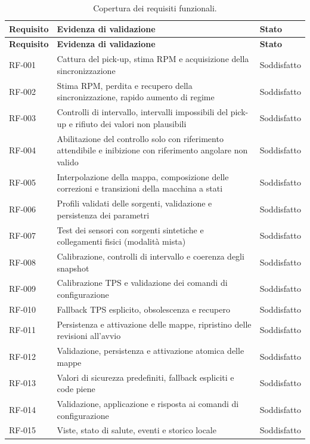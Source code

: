 \documentclass{article}
\begin{document}
{\small
\begin{longtable}{p{} p{} p{}}
\caption{Copertura dei requisiti funzionali.}
\label{tab:copertura} \\
\hline
\textbf{Requisito} & \textbf{Evidenza di validazione} & \textbf{Stato} \\
\hline
\endfirsthead
\hline
\textbf{Requisito} & \textbf{Evidenza di validazione} & \textbf{Stato} \\
\hline
\endhead
\hline
\endfoot
\hline
\endlastfoot
RF-001 & Cattura del pick-up, stima RPM e acquisizione della sincronizzazione & Soddisfatto \\
RF-002 & Stima RPM, perdita e recupero della sincronizzazione, rapido aumento di regime & Soddisfatto \\
RF-003 & Controlli di intervallo, intervalli impossibili del pick-up e rifiuto dei valori non plausibili & Soddisfatto \\
RF-004 & Abilitazione del controllo solo con riferimento attendibile e inibizione con riferimento angolare non valido & Soddisfatto \\
RF-005 & Interpolazione della mappa, composizione delle correzioni e transizioni della macchina a stati & Soddisfatto \\
RF-006 & Profili validati delle sorgenti, validazione e persistenza dei parametri & Soddisfatto \\
RF-007 & Test dei sensori con sorgenti sintetiche e collegamenti fisici (modalità mista) & Soddisfatto \\
RF-008 & Calibrazione, controlli di intervallo e coerenza degli snapshot & Soddisfatto \\
RF-009 & Calibrazione TPS e validazione dei comandi di configurazione & Soddisfatto \\
RF-010 & Fallback TPS esplicito, obsolescenza e recupero & Soddisfatto \\
RF-011 & Persistenza e attivazione delle mappe, ripristino delle revisioni all'avvio & Soddisfatto \\
RF-012 & Validazione, persistenza e attivazione atomica delle mappe & Soddisfatto \\
RF-013 & Valori di sicurezza predefiniti, fallback espliciti e code piene & Soddisfatto \\
RF-014 & Validazione, applicazione e risposta ai comandi di configurazione & Soddisfatto \\
RF-015 & Viste, stato di salute, eventi e storico locale & Soddisfatto \\

\end{longtable}}
\end{document}

